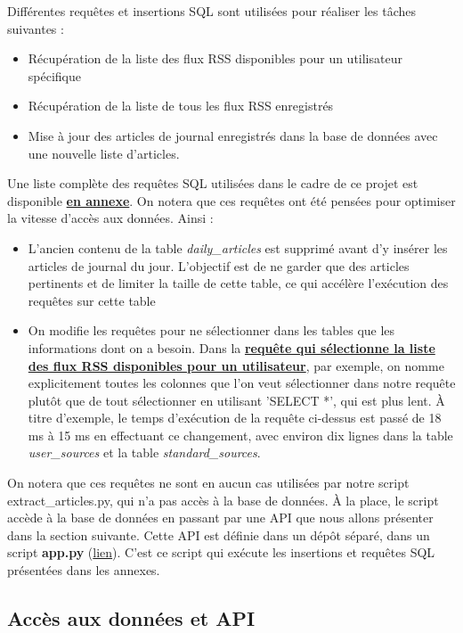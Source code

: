 \documentclass[french]{article}
\begin{document}
    Différentes requêtes et insertions SQL sont utilisées pour réaliser les tâches suivantes :
    \begin{itemize}
        \item Récupération de la liste des flux RSS disponibles pour un utilisateur spécifique
        \item Récupération de la liste de tous les flux RSS enregistrés
        \item Mise à jour des articles de journal enregistrés dans la base de données avec une nouvelle liste d'articles.
    \end{itemize} 
    Une liste complète des requêtes SQL utilisées dans le cadre de ce projet est disponible \textbf{\hyperref[sec:sql]{en annexe}}.
    On notera que ces requêtes ont été pensées pour optimiser la vitesse d'accès aux données. Ainsi :
    \begin{itemize}
        \item L'ancien contenu de la table \textit{daily\_articles} est supprimé avant d'y insérer les articles de journal du jour. L'objectif est de ne garder que des articles pertinents et de limiter la taille de cette table, ce qui accélère l'exécution des requêtes sur cette table
        \item On modifie les requêtes pour ne sélectionner dans les tables que les informations dont on a besoin. Dans la \textbf{\hyperref[sec:query]{requête qui sélectionne la liste des flux RSS disponibles pour un utilisateur}}, par exemple, on nomme explicitement toutes les colonnes que l'on veut sélectionner dans notre requête plutôt que de tout sélectionner en utilisant 'SELECT *', qui est plus lent. À titre d'exemple, le temps d'exécution de la requête ci-dessus est passé de 18 ms à 15 ms en effectuant ce changement, avec environ dix lignes dans la table \textit{user\_sources} et la table \textit{standard\_sources}.
    \end{itemize} 
    

    On notera que ces requêtes ne sont en aucun cas utilisées par notre script extract\_articles.py, qui n'a pas accès à la base de données. À la place, le script accède à la base de données en passant par une API que nous allons présenter dans la section suivante. Cette API est définie dans un dépôt séparé, dans un script \textbf{app.py} (\href{https://github.com/vinpap/your_news_anchor_db_api/blob/main/app.py}{lien}). C'est ce script qui exécute les insertions et requêtes SQL présentées dans les annexes.
    \subsection{Accès aux données et API}
    
\end{document}
